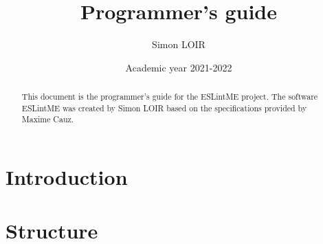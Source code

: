 \documentclass[12pt]{article}
\title{Programmer's guide}
\author{Simon LOIR}
\date{Academic year 2021-2022}
\begin{document}
\begin{titlepage}
\maketitle
\begin{abstract}
\noindent    
This document is the programmer's guide for the ESLintME project. 
The software ESLintME was created by Simon LOIR based on the specifications provided by Maxime Cauz.
\end{abstract}
\end{titlepage}

\section{Introduction}
\section{Structure}


\end{document}
